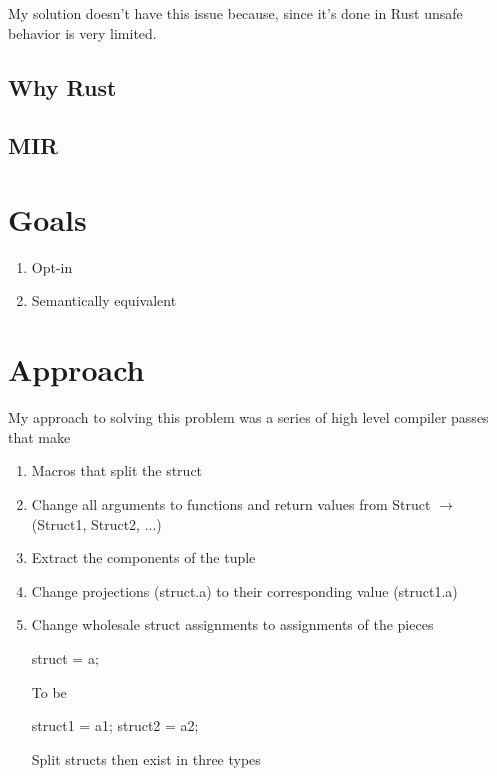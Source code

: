 \documentclass[12pt,final]{article}
\begin{document}
My solution doesn't have this issue because, since it's done in Rust unsafe behavior is very limited.

\subsection{Why Rust}

\subsection{MIR}

\section{Goals}
\label{sec:goal}

\begin{enumerate}
\item Opt-in
\item Semantically equivalent

\end{enumerate}

\section{Approach}

My approach to solving this problem was a series of high level compiler passes
that make 

\begin{enumerate}
\item Macros that split the struct
\item Change all arguments to functions and return values from Struct $\rightarrow$ (Struct1, Struct2, ...)
\item Extract the components of the tuple 
\item Change projections (struct.a) to their corresponding value (struct1.a)
\item Change wholesale struct assignments to assignments of the pieces 

struct = a;

To be

struct1 = a1;
struct2 = a2;

Split structs then exist in three types

\end{enumerate}
\end{document}
